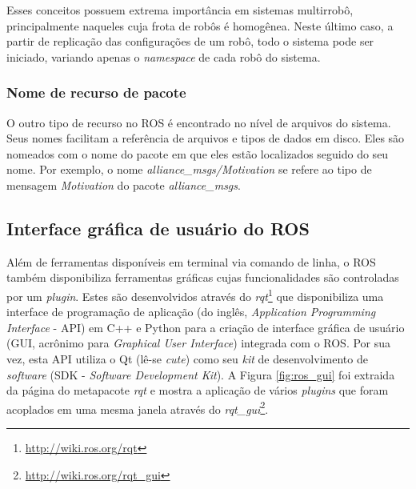                 Esses conceitos possuem extrema importância em sistemas multirrobô, principalmente naqueles cuja frota de robôs é homogênea. Neste último caso, a partir de replicação das configurações de um robô, todo o sistema pode ser iniciado, variando apenas o \textit{namespace} de cada robô do sistema.
            
            \subsubsection{Nome de recurso de pacote} \label{subsubsec:ros_nomes_pacotes}
                O outro tipo de recurso no ROS é encontrado no nível de arquivos do sistema. Seus nomes facilitam a referência de arquivos e tipos de dados em disco. Eles são nomeados com o nome do pacote em que eles estão localizados seguido do seu nome. Por exemplo, o nome \textit{alliance\_msgs/Motivation} se refere ao tipo de mensagem \textit{Motivation} do pacote \textit{alliance\_msgs}.
            
        \subsection{Interface gráfica de usuário do ROS} \label{subsec:ros_gui}
            Além de ferramentas disponíveis em terminal via comando de linha, o ROS também disponibiliza ferramentas gráficas cujas funcionalidades são controladas por um \textit{plugin}. Estes são desenvolvidos através do \textit{rqt}\footnote{\url{http://wiki.ros.org/rqt}} que disponibiliza uma interface de programação de aplicação (do inglês, \textit{Application Programming Interface} - API) em C++ e Python para a criação de interface gráfica de usuário (GUI, acrônimo para \textit{Graphical User Interface}) integrada com o ROS. Por sua vez, esta API utiliza o Qt (lê-se \textit{cute}) como seu \textit{kit} de desenvolvimento de \textit{software} (SDK - \textit{Software Development Kit}). A Figura \ref{fig:ros_gui} foi extraida da página do metapacote \textit{rqt} e mostra a aplicação de vários \textit{plugins} que foram acoplados em uma mesma janela através do \textit{rqt\_gui}\footnote{\url{http://wiki.ros.org/rqt_gui}}.
            
